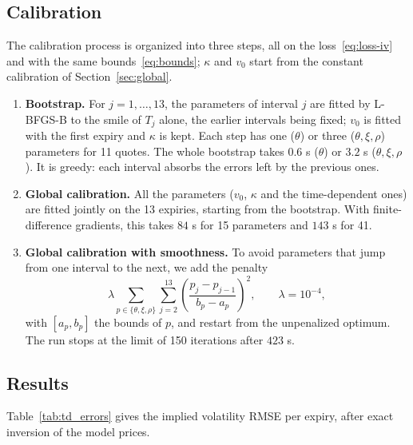 \documentclass[11pt,a4paper]{article}
\theoremstyle{plain}
\theoremstyle{definition}
\begin{document}
\subsection{Calibration}
The calibration process is organized into three steps, all on the loss~\eqref{eq:loss-iv} and with the same bounds~\eqref{eq:bounds}; $\kappa$ and $v_0$ start from the constant calibration of Section~\ref{sec:global}.
\begin{enumerate}
    \item \textbf{Bootstrap.} For $j=1,\dots,13$, the parameters of interval $j$ are fitted by L-BFGS-B to the smile of $T_j$ alone, the earlier intervals being fixed; $v_0$ is fitted with the first expiry and $\kappa$ is kept. Each step has one ($\theta$) or three ($\theta,\xi,\rho$) parameters for 11 quotes. The whole bootstrap takes $0.6$ s ($\theta$) or $3.2$ s ($\theta,\xi,\rho$). It is greedy: each interval absorbs the errors left by the previous ones.
    \item \textbf{Global calibration.} All the parameters ($v_0$, $\kappa$ and the time-dependent ones) are fitted jointly on the 13 expiries, starting from the bootstrap. With finite-difference gradients, this takes $84$ s for 15 parameters and $143$ s for 41.
    \item \textbf{Global calibration with smoothness.} To avoid parameters that jump from one interval to the next, we add the penalty
    \begin{equation}
        \lambda\sum_{p\in\{\theta,\xi,\rho\}}\sum_{j=2}^{13}\left(\frac{p_j-p_{j-1}}{b_p-a_p}\right)^2,\qquad\lambda=10^{-4},
        \label{eq:smoothness}
    \end{equation}
    with $[a_p,b_p]$ the bounds of $p$, and restart from the unpenalized optimum. The run stops at the limit of 150 iterations after $423$ s.
\end{enumerate}

\subsection{Results}
Table~\ref{tab:td_errors} gives the implied volatility RMSE per expiry, after exact inversion of the model prices.
\end{document}
